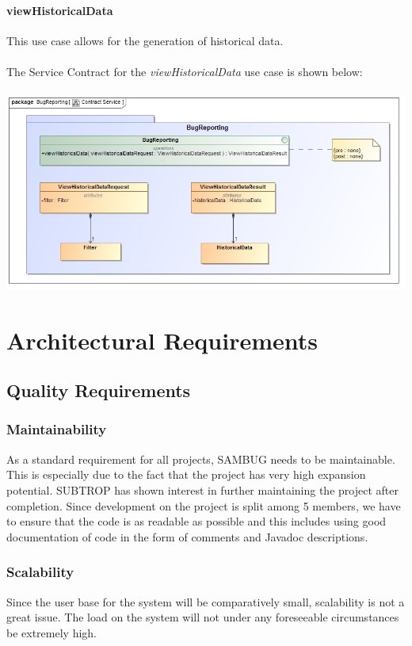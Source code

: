 \documentclass[11pt,a4paper,titlepage]{article}
\begin{document}
		\paragraph{viewHistoricalData }
		This use case allows for the generation of historical data.\\\hfill\\
		The Service Contract for the \textit{viewHistoricalData} use case is shown below:\\\hfill\\
				\includegraphics[width=\linewidth]{viewHistoricalDataSC}	

	
		
		
\section{Architectural Requirements}
	\subsection{Quality Requirements}
		\subsubsection{Maintainability}
			As a standard requirement for all projects, SAMBUG needs to be maintainable. This is especially due to the fact that the project has very high expansion potential. SUBTROP has shown interest in further maintaining the project after completion.
			Since development on the project is split among 5 members, we have to ensure that the code is as readable as possible and this includes using good documentation of code in the form of comments and Javadoc descriptions.
		\subsubsection{Scalability}
			Since the user base for the system will be comparatively small, scalability is not a great issue. The load on the system will not under any foreseeable circumstances be extremely high. 
\end{document}
